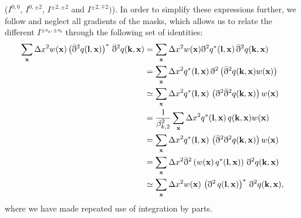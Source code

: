 \documentclass[a4paper,11pt]{article}
\newcommand{\summ}[1]{\sum_{\bf #1}\Delta #1^2}
\begin{document}
      ($I^{0,0}$, $I^{0,\pm2}$, $I^{\pm2,\pm2}$ and $I^{\pm2,\mp2})$). In
      order to simplify these expressions further, we follow \cite{2017A&A...602A..41C} and neglect all gradients of the masks, which allows us to relate the different $I^{\pm s_a,\pm s_b}$ through the following set of identities:
      \begin{align}\nonumber
        \summ{x}w({\bf x})\left(\bar{\eth}^2q({\bf l},{\bf x})\right)^*\,\bar{\eth}^2q({\bf k},{\bf x})
        &=\summ{x}w({\bf x})\eth^2 q^*({\bf l},{\bf x})\,\bar{\eth}^2q({\bf k},{\bf x})\\\nonumber
        &=\summ{x}q^*({\bf l},{\bf x})\,\eth^2\left(\bar{\eth}^2q({\bf k},{\bf x})w({\bf x})\right)\\\nonumber
        &\simeq\summ{x}q^*({\bf l},{\bf x})\,\left(\eth^2\bar{\eth}^2q({\bf k},{\bf x})\right)w({\bf x})\\
        &=\frac{1}{\beta^2_{k,2}}\summ{x}q^*({\bf l},{\bf x})\,q({\bf k},{\bf x})w({\bf x})\\\nonumber
        &=\summ{x}q^*({\bf l},{\bf x})\,\left(\bar{\eth}^2\eth^2q({\bf k},{\bf x})\right)w({\bf x})\\\nonumber
        &=\summ{x}\bar{\eth}^2\left(w({\bf x})\,q^*({\bf l},{\bf x})\right)\,\eth^2q({\bf k},{\bf x})\\
        &\simeq\summ{x}w({\bf x})\,\left(\eth^2\,q({\bf l},{\bf x})\right)^*\,\eth^2q({\bf k},{\bf x}),
      \end{align}
      where we have made repeated use of integration by parts.
    
\end{document}
